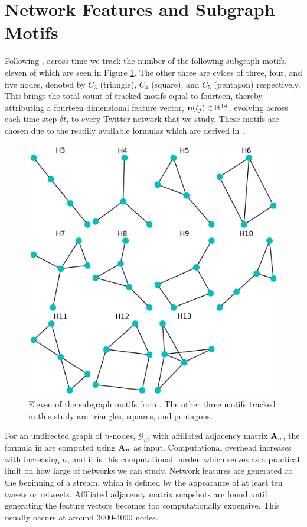\documentclass[a4paper,11pt]{article}
\begin{document}
\section{Network Features and Subgraph Motifs}
Following \cite{alon}, across time we track the number of the following subgraph motifs, eleven of which are seen in Figure \ref{fig:motifs}.  The other three are cylces of three, four, and five nodes, denoted by $C_{3}$ (triangle), $C_{4}$ (square), and $C_{5}$ (pentagon) respectively.  This brings the total count of tracked motifs equal to fourteen, thereby attributing a fourteen dimensional feature vector, ${\bf n}(t_{j})\in\mathbb{R}^{14}$, evolving across each time step $\delta t$, to every Twitter network that we study.  These motifs are chosen due to the readily available formulas which are derived in \cite{alon}.  
\begin{figure}[!h]
\centering
\includegraphics[width=.8\textwidth]{Images/mega_motif}
\caption{Eleven of the subgraph motifs from \cite{alon}.  The other three motifs tracked in this study are triangles, squares, and pentagons.}
\label{fig:motifs}
\end{figure}

For an undirected graph of $n$-nodes, $\mathcal{G}_{n}$, with affiliated adjacency matrix ${\bf A}_{n}$, the formula in \cite{alon} are computed using ${\bf A}_{n}$ as input.  Computational overhead increases with increasing $n$, and it is this computational burden which serves as a practical limit on how large of networks we can study.  Network features are generated at the beginning of a stream, which is defined by the appearance of at least ten tweets or retweets. Affiliated adjacency matrix snapshots are found until generating the feature vectors becomes too computationally expensive.  This usually occurs at around 3000-4000 nodes. 
\end{document}
